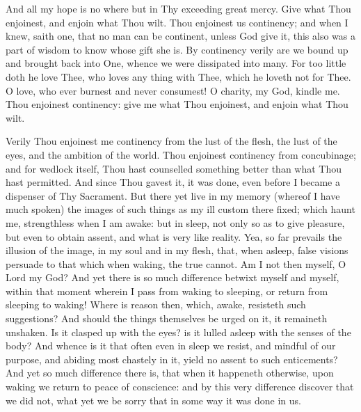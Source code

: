 \documentclass[b5paper,openright,12pt,twoside]{book}
\begin{document}
And all my hope is no where but in Thy exceeding great mercy. Give what
Thou enjoinest, and enjoin what Thou wilt. Thou enjoinest us continency;
and when I knew, saith one, that no man can be continent, unless God
give it, this also was a part of wisdom to know whose gift she is. By
continency verily are we bound up and brought back into One, whence we
were dissipated into many. For too little doth he love Thee, who loves
any thing with Thee, which he loveth not for Thee. O love, who ever
burnest and never consumest! O charity, my God, kindle me. Thou
enjoinest continency: give me what Thou enjoinest, and enjoin what Thou
wilt.

Verily Thou enjoinest me continency from the lust of the flesh, the lust
of the eyes, and the ambition of the world. Thou enjoinest continency
from concubinage; and for wedlock itself, Thou hast counselled something
better than what Thou hast permitted. And since Thou gavest it, it was
done, even before I became a dispenser of Thy Sacrament. But there yet
live in my memory (whereof I have much spoken) the images of such things
as my ill custom there fixed; which haunt me, strengthless when I am
awake: but in sleep, not only so as to give pleasure, but even to obtain
assent, and what is very like reality. Yea, so far prevails the illusion
of the image, in my soul and in my flesh, that, when asleep, false
visions persuade to that which when waking, the true cannot. Am I not
then myself, O Lord my God? And yet there is so much difference betwixt
myself and myself, within that moment wherein I pass from waking to
sleeping, or return from sleeping to waking! Where is reason then,
which, awake, resisteth such suggestions? And should the things
themselves be urged on it, it remaineth unshaken. Is it clasped up with
the eyes? is it lulled asleep with the senses of the body? And whence is
it that often even in sleep we resist, and mindful of our purpose, and
abiding most chastely in it, yield no assent to such enticements? And
yet so much difference there is, that when it happeneth otherwise, upon
waking we return to peace of conscience: and by this very difference
discover that we did not, what yet we be sorry that in some way it was
done in us.
\end{document}
